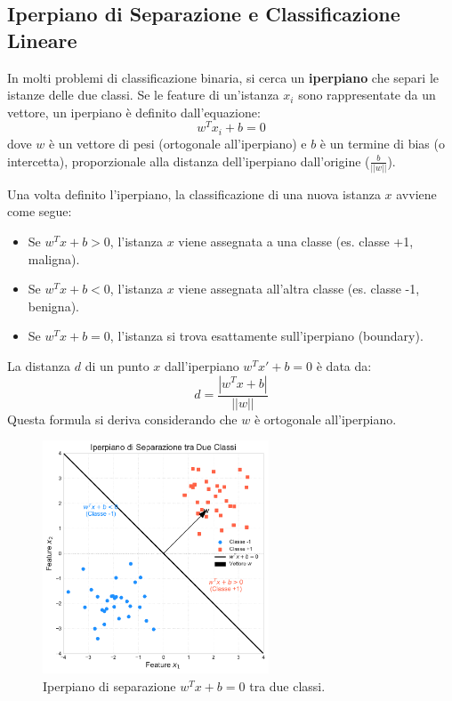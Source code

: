 \documentclass{article}
\begin{document}
\subsection{Iperpiano di Separazione e Classificazione Lineare}
In molti problemi di classificazione binaria, si cerca un \textbf{iperpiano} che separi le istanze delle due classi. Se le feature di un'istanza $x_i$ sono rappresentate da un vettore, un iperpiano è definito dall'equazione:
$$ w^T x_i + b = 0 $$
dove $w$ è un vettore di pesi (ortogonale all'iperpiano) e $b$ è un termine di bias (o intercetta), proporzionale alla distanza dell'iperpiano dall'origine ($\frac{b}{||w||}$).

Una volta definito l'iperpiano, la classificazione di una nuova istanza $x$ avviene come segue:
\begin{itemize}
    \item Se $w^T x + b > 0$, l'istanza $x$ viene assegnata a una classe (es. classe +1, maligna).
    \item Se $w^T x + b < 0$, l'istanza $x$ viene assegnata all'altra classe (es. classe -1, benigna).
    \item Se $w^T x + b = 0$, l'istanza si trova esattamente sull'iperpiano (boundary).
\end{itemize}
La distanza $d$ di un punto $x$ dall'iperpiano $w^T x' + b = 0$ è data da:
$$ d = \frac{|w^T x + b|}{||w||} $$
Questa formula si deriva considerando che $w$ è ortogonale all'iperpiano.

\begin{figure}[H]
    \centering
    \includegraphics[width=0.6\textwidth]{images/hyperplane_separation.pdf}
    \caption{Iperpiano di separazione $w^T x + b = 0$ tra due classi.}
    \label{fig:hyperplane_separation}
\end{figure}
\end{document}
